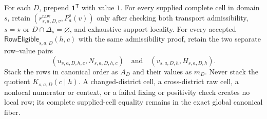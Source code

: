 For each \(D\), prepend \(\mathbf1^{\mathsf T}\) with value \(1\).  For every supplied complete cell in domain \(s\), retain \((r^{\mathrm{raw}}_{s,a,D,v},P_a^s(v))\) only after checking both transport admissibility, \(s=\star\) or \(D\cap\Delta_s=\varnothing\), and exhaustive support locality.  For every accepted \(\mathsf{RowEligible}_{s,a,D}(h,c)\) with the same admissibility proof, retain the two separate row--value pairs
\[
(u_{s,a,D,h,c},N_{s,a,D,h,c})
\quad\text{and}\quad
(v_{s,a,D,h},H_{s,a,D,h}).
\]
Stack the rows in canonical order as \(A_D\) and their values as \(m_D\).  Never stack the quotient \(K_{s,a,D}(c\mid h)\).  A changed-district cell, a cross-district raw cell, a nonlocal numerator or context, or a failed fixing or positivity check creates no local row; its complete supplied-cell equality remains in the exact global canonical fiber.